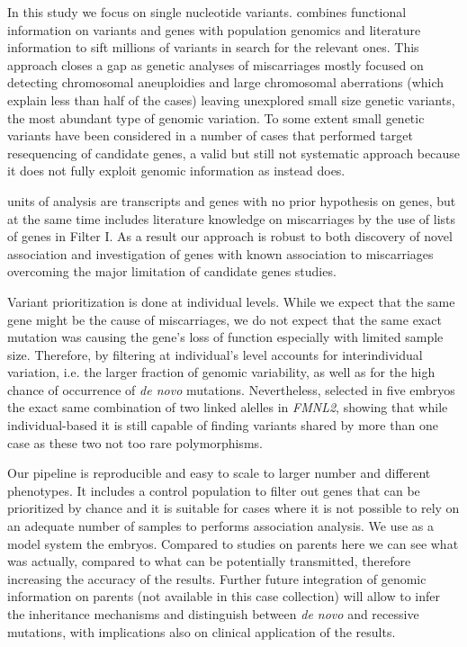 In this study we focus on single nucleotide variants. \gp combines functional information on variants and genes with population genomics and literature information to sift millions of variants in search for the relevant ones. This approach closes a gap as genetic analyses of miscarriages mostly focused on detecting chromosomal aneuploidies and large chromosomal aberrations (which explain less than half of the cases) leaving unexplored small size genetic variants, the most abundant type of genomic variation. To some extent small genetic variants have been considered in a number of cases that performed target resequencing of candidate genes, a valid but still not systematic approach because it does not fully exploit genomic information as instead \gp does.

\gp units of analysis are transcripts and genes with no prior hypothesis on genes, but at the same time \gp includes literature knowledge on miscarriages by the use of lists of genes in Filter I. As a result our approach is robust to both discovery of novel association and investigation of genes with known association to miscarriages overcoming the major limitation of candidate genes studies. 

Variant prioritization is done at individual levels. While we expect that the same gene might be the cause of miscarriages, we do not expect that the same exact mutation was causing the gene's loss of function especially with limited sample size. Therefore, by filtering at individual's level \gp accounts for interindividual variation, i.e. the larger fraction of genomic variability, as well as for the high chance of occurrence of \textit{de novo} mutations. Nevertheless, \gp selected in five embryos the exact same combination of two linked alelles in \textit{FMNL2}, showing that while individual-based it is still capable of finding variants shared by more than one case as these two not too rare polymorphisms. 


Our pipeline is reproducible and easy to scale to larger number and different phenotypes. It includes a control population to filter out genes that can be prioritized by chance and it is suitable for cases where it is not possible to rely on an adequate number of samples to performs association analysis. We use as a model system the embryos. Compared to studies on parents here we can see what was actually, compared to what can be potentially transmitted, therefore increasing the accuracy of the results. Further future integration of genomic information on parents (not available in this case collection) will allow to infer the inheritance mechanisms and distinguish between \textit{de novo} and recessive mutations, with implications also on clinical application of the results. %



